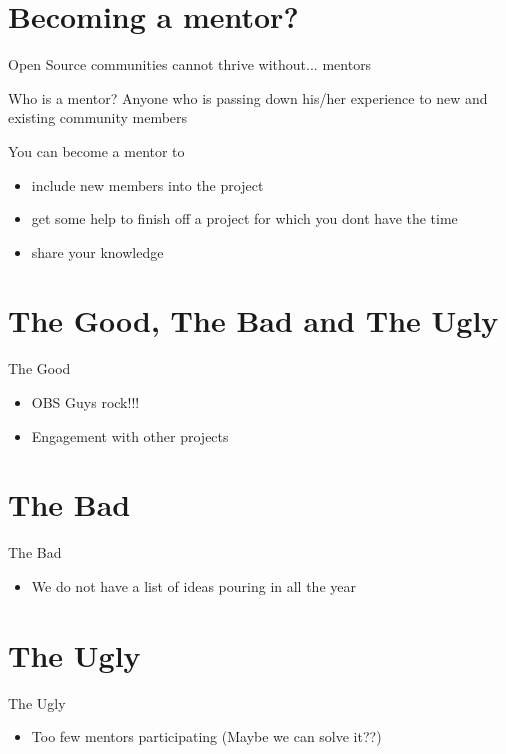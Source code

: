 \documentclass{beamer}
\begin{document}
\section{Becoming a mentor?}
\begin{frame}{Open Source communities cannot thrive without...}
\pause
mentors
\end{frame}

\begin{frame}{Who is a mentor?}
\pause
Anyone who is passing down his/her experience to new and existing community members
\end{frame}


\begin{frame}{You can become a mentor to}
\pause
\begin{itemize}
\item include new members into the project \pause
\item get some help to finish off a project for which you dont have the time \pause
\item share your knowledge \pause
\end{itemize}
\end{frame} 

\section{The Good, The Bad and The Ugly}
\begin{frame}{The Good}
\pause
\begin{itemize}
\item OBS Guys rock!!! \pause
\item Engagement with other projects \pause
\end{itemize}
\end{frame}


\section{The Bad}
\begin{frame}{The Bad}
\pause
\begin{itemize}
\item We do not have a list of ideas pouring in all the year \pause
\end{itemize}
\end{frame}

\section{The Ugly}
\begin{frame}{The Ugly}
\pause
\begin{itemize}
\item Too few mentors participating (Maybe we can solve it??) \pause
\end{itemize}
\end{frame}
\end{document}
